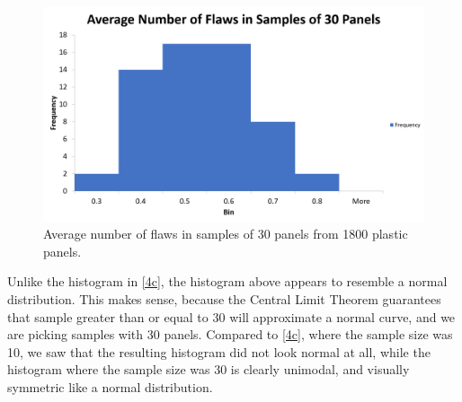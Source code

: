 \documentclass[letterpaper]{article}
\begin{document}
\section{}%

\subsection{}%

\begin{figure}[H]
 \centering
 \includegraphics[width=\textwidth]{q5.png}
 \caption{Average number of flaws in samples of 30 panels from 1800 plastic panels.}
 \label{5a}
\end{figure}

Unlike the histogram in \ref{4c}, the histogram above appears to resemble a normal
distribution. This makes sense, because the Central Limit Theorem guarantees
that sample greater than or equal to 30 will approximate a
normal curve, and we are picking samples with 30 panels. Compared to
\ref{4c}, where the sample size was 10, we saw that the resulting histogram
did not look normal at all, while the histogram where the sample size was 30
is clearly unimodal, and visually symmetric like a normal distribution.

\subsection{}%
\end{document}
